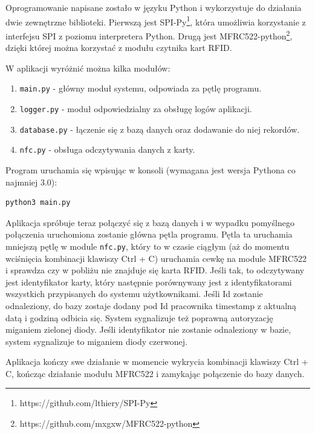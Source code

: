 Oprogramowanie napisane zostało w języku Python i wykorzystuje do działania dwie zewnętrzne biblioteki. Pierwszą jest SPI-Py\footnote{https://github.com/lthiery/SPI-Py}, która umożliwia korzystanie z interfejsu SPI z poziomu interpretera Python. Drugą jest MFRC522-python\footnote{https://github.com/mxgxw/MFRC522-python}, dzięki której można korzystać z modułu czytnika kart RFID.

W aplikacji wyróżnić można kilka modułów:

\begin{enumerate}
  \item \texttt{main.py} - główny moduł systemu, odpowiada za pętlę programu.
  \item \texttt{logger.py} - moduł odpowiedzialny za obsługę logów aplikacji.
  \item \texttt{database.py} - łączenie się z bazą danych oraz dodawanie do niej rekordów.
  \item \texttt{nfc.py} - obsługa odczytywania danych z karty.
\end{enumerate}

Program uruchamia się wpisując w konsoli (wymagana jest wersja Pythona co najmniej 3.0):

\begin{verbatim}
python3 main.py
\end{verbatim}

Aplikacja spróbuje teraz połączyć się z bazą danych i w wypadku pomyślnego połączenia uruchomiona zostanie główna pętla programu. Pętla ta uruchamia mniejszą pętlę w module \texttt{nfc.py}, który to w czasie ciągłym (aż do momentu wciśnięcia kombinacji klawiszy Ctrl + C) uruchamia cewkę na module MFRC522 i sprawdza czy w pobliżu nie znajduje się karta RFID. Jeśli tak, to odczytywany jest identyfikator karty, który następnie porównywany jest z identyfikatorami wszystkich przypisanych do systemu użytkownikami. Jeśli Id zostanie odnaleziony, do bazy zostaje dodany pod Id pracownika timestamp z aktualną datą i godziną odbicia się. System sygnalizuje też poprawną autoryzację miganiem zielonej diody. Jeśli identyfikator nie zostanie odnaleziony w bazie, system sygnalizuje to miganiem diody czerwonej.

Aplikacja kończy swe działanie w momencie wykrycia kombinacji klawiszy Ctrl + C, kończąc działanie modułu MFRC522 i zamykając połączenie do bazy danych.